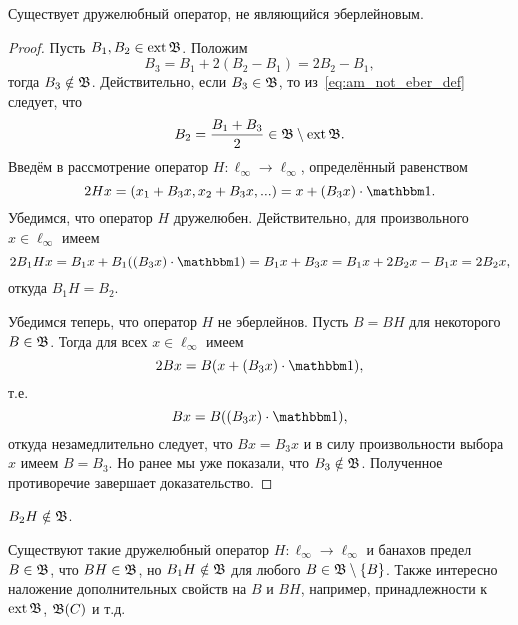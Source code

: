\begin{theorem}
	\label{thm:amiable_but_not_Eberlein_exists}
	Существует дружелюбный оператор, не являющийся эберлейновым.
\end{theorem}

\begin{proof}
	Пусть $B_1, B_2 \in \operatorname{ext} \mathfrak{B}$.
	Положим
	\begin{equation}
		\label{eq:am_not_eber_def}
		B_3 = B_1 + 2(B_2-B_1) = 2B_2-B_1,
	\end{equation}
	тогда $B_3 \notin \mathfrak{B}$.
	Действительно, если $B_3 \in \mathfrak{B}$, то из~\eqref{eq:am_not_eber_def} следует, что
	\begin{equation}
		B_2 = \frac{B_1 + B_3}2 \in \mathfrak{B} \setminus \operatorname{ext} \mathfrak{B}
		.
	\end{equation}
	Введём в рассмотрение оператор $H:\ell_\infty\to\ell_\infty$, определённый равенством
	\begin{equation}
		2Hx = (x_1 + B_3x, x_2 + B_3x, ...) = x + (B_3 x) \cdot \one
		.
	\end{equation}
	Убедимся, что оператор $H$ дружелюбен.
	Действительно, для произвольного $x\in\ell_\infty$ имеем
	\begin{equation}
		2 B_1 H x = B_1 x + B_1 ((B_3 x) \cdot\one) = B_1 x + B_3 x =
		B_1 x + 2 B_2 x - B_1 x = 2B_2 x
		,
	\end{equation}
	откуда $B_1 H = B_2$.

	Убедимся теперь, что оператор $H$ не эберлейнов.
	Пусть $B = BH$ для некоторого $B\in\mathfrak{B}$.
	Тогда для всех $x\in\ell_\infty$ имеем
	\begin{equation}
		2Bx = B (x + (B_3 x) \cdot \one)
		,
	\end{equation}
	т.е.
	\begin{equation}
		Bx =  B((B_3 x) \cdot \one)
		,
	\end{equation}
	откуда незамедлительно следует, что $Bx = B_3x$ и в силу произвольности выбора $x$ имеем $B=B_3$.
	Но ранее мы уже показали, что $B_3\notin \mathfrak{B}$.
	Полученное противоречие завершает доказательство.
\end{proof}

\begin{hypothesis}
	$B_2H\notin \mathfrak{B}$.
\end{hypothesis}

\begin{hypothesis}
	Существуют такие дружелюбный оператор $H:\ell_\infty\to\ell_\infty$ и банахов предел $B\in \mathfrak{B}$,
	что $BH \in \mathfrak{B}$, но $B_1 H \notin \mathfrak{B}$ для любого $B\in \mathfrak{B}\setminus\{B\}$.
	Также интересно наложение дополнительных свойств на $B$ и $BH$, например, принадлежности к $\operatorname{ext}\mathfrak{B}$, $\mathfrak{B}(C)$ и т.д.
\end{hypothesis}

